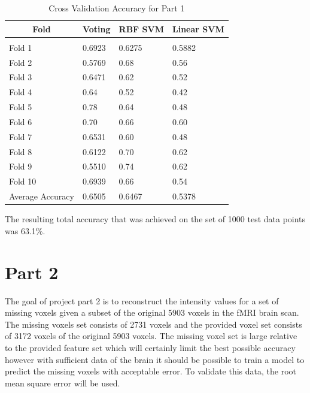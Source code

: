 \documentclass{article} %
\begin{document}
\begin{table}[h]
\caption{Cross Validation Accuracy for Part 1}
\label{classtable}
\begin{center}
	\begin{tabular}{llll}
		\multicolumn{1}{c}{\bf Fold}  &\multicolumn{1}{c}{\bf Voting} &\multicolumn{1}{c}{\bf RBF SVM} &\multicolumn{1}{c}{\bf Linear SVM}
		\\ \hline \\
		Fold 1   &0.6923 &0.6275 &0.5882\\
		Fold 2   &0.5769 &0.68 &0.56\\
		Fold 3   &0.6471 &0.62 &0.52\\
		Fold 4   &0.64   &0.52 &0.42\\
		Fold 5   &0.78   &0.64 &0.48\\
		Fold 6   &0.70   &0.66 &0.60\\
		Fold 7   &0.6531 &0.60 &0.48\\
		Fold 8   &0.6122 &0.70 &0.62\\
		Fold 9   &0.5510 &0.74 &0.62\\
		Fold 10   &0.6939 &0.66 &0.54\\
		Average Accuracy   &0.6505 &0.6467 &0.5378\\
	\end{tabular}
\end{center}
\end{table} 

The resulting total accuracy that was achieved on the set of 1000 test data points was 63.1\%.

\section{Part 2}
The goal of project part 2 is to reconstruct the intensity values for a set of missing voxels given a subset of the original 5903 voxels in the fMRI brain scan. The missing voxels set consists of 2731 voxels and the provided voxel set consists of 3172 voxels of the original 5903 voxels. The missing voxel set is large relative to the provided feature set which will certainly limit the best possible accuracy however with sufficient data of the brain it should be possible to train a model to predict the missing voxels with acceptable error. To validate this data, the root mean square error will be used.
\end{document}
